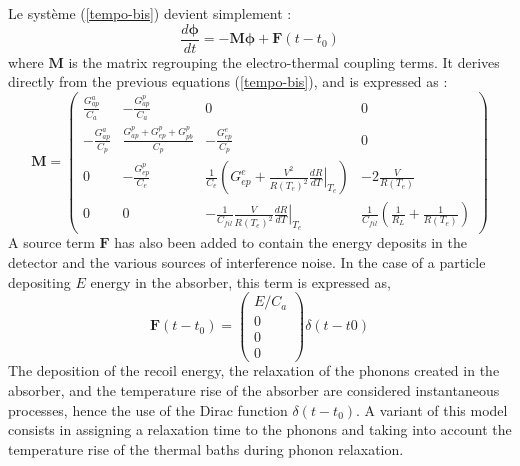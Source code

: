 Le système (\ref{tempo-bis}) devient simplement :
\begin{equation}
\label{ode-mat}
\frac{d \bm{\phi}}{d t}= - \bm{M} \bm{\phi} + \bm{F}(t-t_0)
\end{equation}
where $\bm{M}$ is the matrix regrouping the electro-thermal coupling terms. It derives directly from the previous equations (\ref{tempo-bis}), and is expressed as :
\begin{equation}
\label{coupling-mat-temp}
\bm{M} = 
\left( \begin{array}{cccc}
 \frac{G_{ap}^a}{C_a}&-\frac{G_{ap}^p}{C_a}&0&0 \\
 -\frac{G_{ap}^a}{C_p}&\frac{G_{ap}^p+G_{ep}^p+G_{pb}^p}{C_p}&-\frac{G_{ep}^e}{C_p}&0 \\
0&-\frac{G_{ep}^p}{C_e}&\frac{1}{C_e}\left(G_{ep}^e + \frac{V^2}{R(T_e)^2}  \left.\frac{d R}{d T}\right\vert_{T_e} \right)&-2\frac{V}{R(T_e)}\\
0&0&-\frac{1}{C_{fil}}\frac{V}{R(T_e)^2} \left.\frac{d R}{d T}\right\vert_{T_e} &\frac{1}{C_{fil}}\left( \frac{1}{R_L} + \frac{1}{R(T_e)} \right)
\end{array} \right)
\end{equation}
A source term $\bm{F}$ has also been added to contain the energy deposits in the detector and the various sources of interference noise. In the case of a particle depositing $E$ energy in the absorber, this term is expressed as,
\begin{equation}
\bm{F}(t-t_0) = 
\left( \begin{array}{c}
E/C_a \\
0 \\
0 \\
0
\end{array} \right) \delta (t-t0)
\end{equation}
The deposition of the recoil energy, the relaxation of the phonons created in the absorber, and the temperature rise of the absorber are considered instantaneous processes, hence the use of the Dirac function $\delta (t-t_0)$. A variant of this model consists in assigning a relaxation time to the phonons and taking into account the temperature rise of the thermal baths during phonon relaxation.

